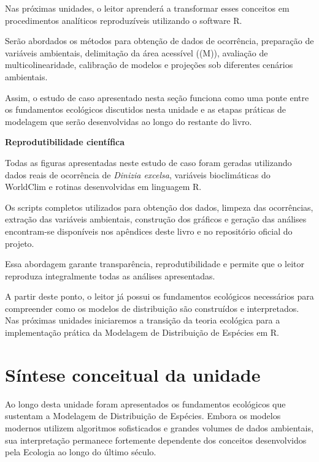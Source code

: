 Nas próximas unidades, o leitor aprenderá a transformar esses conceitos em procedimentos analíticos reproduzíveis utilizando o software R.

Serão abordados os métodos para obtenção de dados de ocorrência, preparação de variáveis ambientais, delimitação da área acessível ((M)), avaliação de multicolinearidade, calibração de modelos e projeções sob diferentes cenários ambientais.

Assim, o estudo de caso apresentado nesta seção funciona como uma ponte entre os fundamentos ecológicos discutidos nesta unidade e as etapas práticas de modelagem que serão desenvolvidas ao longo do restante do livro.

\begin{importantbox}
	
	\textbf{Reprodutibilidade científica}
	
	Todas as figuras apresentadas neste estudo de caso foram geradas utilizando dados reais de ocorrência de \textit{Dinizia excelsa}, variáveis bioclimáticas do WorldClim e rotinas desenvolvidas em linguagem R.
	
	Os scripts completos utilizados para obtenção dos dados, limpeza das ocorrências, extração das variáveis ambientais, construção dos gráficos e geração das análises encontram-se disponíveis nos apêndices deste livro e no repositório oficial do projeto.
	
	Essa abordagem garante transparência, reprodutibilidade e permite que o leitor reproduza integralmente todas as análises apresentadas.
	
\end{importantbox}

A partir deste ponto, o leitor já possui os fundamentos ecológicos necessários para compreender como os modelos de distribuição são construídos e interpretados. Nas próximas unidades iniciaremos a transição da teoria ecológica para a implementação prática da Modelagem de Distribuição de Espécies em R.

\section{Síntese conceitual da unidade}

Ao longo desta unidade foram apresentados os fundamentos ecológicos que sustentam a Modelagem de Distribuição de Espécies. Embora os modelos modernos utilizem algoritmos sofisticados e grandes volumes de dados ambientais, sua interpretação permanece fortemente dependente dos conceitos desenvolvidos pela Ecologia ao longo do último século.

